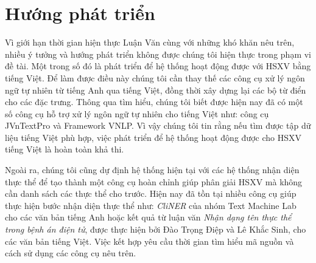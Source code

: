 \section{Hướng phát triển}
Vì giới hạn thời gian hiện thực Luận Văn cùng với những khó khăn nêu trên, nhiều ý tưởng và hướng phát triển không được chúng tôi hiện thực trong phạm vi đề tài. Một trong số đó là phát triển để hệ thống hoạt động được với HSXV bằng tiếng Việt. Để làm được điều này chúng tôi cần thay thế các công cụ xử lý ngôn ngữ tự nhiên từ tiếng Anh qua tiếng Việt, đồng thời xây dựng lại các bộ từ điển cho các đặc trưng. Thông qua tìm hiểu, chúng tôi biết được hiện nay đã có một số công cụ hỗ trợ xử lý ngôn ngữ tự nhiên cho tiếng Việt như: công cụ JVnTextPro và Framework VNLP. Vì vậy chúng tôi tin rằng nếu tìm được tập dữ liệu tiếng Việt phù hợp, việc phát triển để hệ thống hoạt động được cho HSXV tiếng Việt là hoàn toàn khả thi.

Ngoài ra, chúng tôi cũng dự định hệ thống hiện tại với các hệ thống nhận diện thực thể để tạo thành một công cụ hoàn chỉnh giúp phân giải HSXV mà không cần danh sách các thực thể cho trước. Hiện nay đã tồn tại nhiều công cụ giúp thực hiện bước nhận diện thực thể như: \textit{CliNER} của nhóm Text Machine Lab cho các văn bản tiếng Anh hoặc kết quả từ luận văn \textit{Nhận dạng tên thực thể trong bệnh án điện tử}, được thực hiện bởi Đào Trọng Điệp và Lê Khắc Sinh, cho các văn bản tiếng Việt. Việc kết hợp yêu cầu thời gian tìm hiểu mã nguồn và cách sử dụng các công cụ nêu trên.
